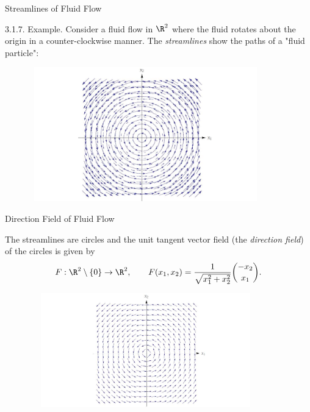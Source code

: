 \documentclass[smaller,hyperref={CJKbookmarks=true}]{beamer}
\begin{document}
\begin{frame}[t]{Streamlines of Fluid Flow}
\begin{spacing}{1.1}
\alert{3.1.7. Example.} Consider a fluid flow in $\R^2$ where the fluid rotates about the origin in a counter-clockwise manner. The \emph{streamlines} show the paths of a "fluid particle":
\vspace*{-6pt}
\begin{figure}
  \centering
  \includegraphics[width=0.9\textwidth,height=165pt]{63.jpg}

\end{figure}
\end{spacing}
\end{frame}
\begin{frame}[t]{Direction Field of Fluid Flow}
\begin{spacing}{1.1}
The streamlines are circles and the unit tangent vector field (the \emph{direction field}) of the circles is given by
\begin{equation}\label{3.1.3}
  F:\R^2\setminus\{0\}\to\R^2,\qquad
  F(x_1,x_2)=\frac{1}{\sqrt{x_1^2+x_2^2}}\binom{-x_2}{x_1}.
\end{equation}
\vspace*{-18pt}
\begin{figure}
  \centering
  \includegraphics[width=0.9\textwidth,height=140pt]{64.jpg}

\end{figure}
\end{spacing}
\end{frame}
\end{document}
